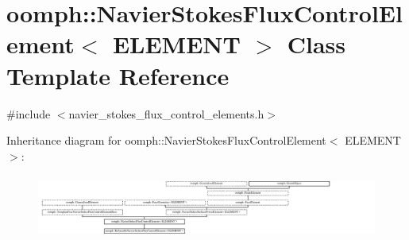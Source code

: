 \hypertarget{classoomph_1_1NavierStokesFluxControlElement}{}\section{oomph\+:\+:Navier\+Stokes\+Flux\+Control\+Element$<$ E\+L\+E\+M\+E\+NT $>$ Class Template Reference}
\label{classoomph_1_1NavierStokesFluxControlElement}


{\ttfamily \#include $<$navier\+\_\+stokes\+\_\+flux\+\_\+control\+\_\+elements.\+h$>$}

Inheritance diagram for oomph\+:\+:Navier\+Stokes\+Flux\+Control\+Element$<$ E\+L\+E\+M\+E\+NT $>$\+:\begin{figure}[H]
\begin{center}
\leavevmode
\includegraphics[height=2.159383cm]{classoomph_1_1NavierStokesFluxControlElement}
\end{center}
\end{figure}
